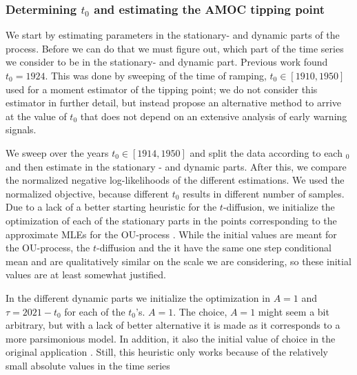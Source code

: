 \subsubsection{Determining \texorpdfstring{$t_0$}{t0} and estimating the AMOC tipping point}
We start by estimating parameters in the stationary- and dynamic parts of the process. Before we can do that we must figure out, which part of the time series we consider to be in the stationary- and dynamic part. Previous work found $t_0 = 1924$. This was done by sweeping of the time of ramping, $t_0 \in [1910, 1950]$ used for a moment estimator of the tipping point; we do not consider this estimator in further detail, but instead propose an alternative method to arrive at the value of $t_0$ that does not depend on an extensive analysis of early warning signals. 

We sweep over the years $t_0 \in [1914, 1950]$ and split the data according to each $_0$ and then estimate in the stationary - and dynamic parts. After this, we compare the normalized negative log-likelihoods of the different estimations. We used the normalized objective, because different $t_0$ results in different number of samples. Due to a lack of a better starting heuristic for the $t$-diffusion, we initialize the optimization of each of the stationary parts in the points corresponding to the approximate MLEs for the OU-process \cite[equation (S4-S6)]{DitlevsenSupplementary}. While the initial values are meant for the OU-process, the $t$-diffusion and the it have the same one step conditional mean and are qualitatively similar on the scale we are considering, so these initial values are at least somewhat justified.

In the different dynamic parts we initialize the optimization in $A = 1$ and $\tau = 2021 - t_0$ for each of the $t_0$'s. $A = 1$. The choice, $A = 1$ might seem a bit arbitrary, but with a lack of better alternative it is made as it corresponds to a more parsimonious model. In addition, it also the initial value of choice in the original application \cite{Ditlevsen2023}. Still, this heuristic only works because of the relatively small absolute values in the time series


